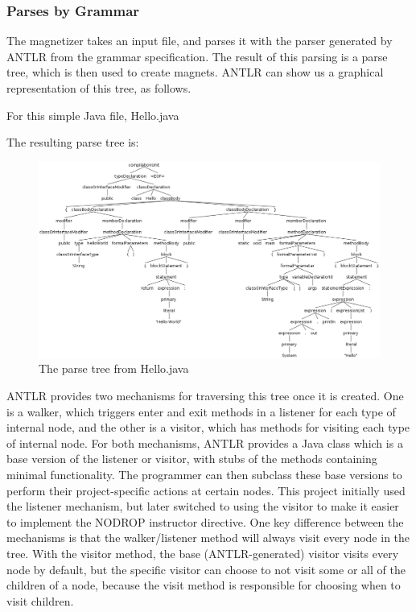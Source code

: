 \documentclass[letter,10pt,final]{article}
\begin{document}
\subsubsection{Parses by Grammar}

The magnetizer takes an input file, and parses it with the parser 
generated by ANTLR from the grammar specification. The result of this 
parsing is a parse tree, which is then used to create magnets. ANTLR 
can show us a graphical representation of this tree, as follows.

For this simple Java file, Hello.java


The resulting parse tree is:

\begin{figure}[h!]
 \centering
 \includegraphics[width=\linewidth]{./images/hello_parse_tree.png}
 \caption{The parse tree from Hello.java}
 \label{fig:hello_parse_tree}
\end{figure}

ANTLR provides two mechanisms for traversing this tree once it is 
created. One is a walker, which triggers enter and exit methods in a 
listener for each type of internal node, and the other is a visitor, 
which has methods for visiting each type of internal node. For 
both mechanisms, ANTLR provides a Java class which is a base version of 
the listener or visitor, with stubs of the methods containing minimal 
functionality. The programmer can then subclass these base 
versions to perform their project-specific actions at certain nodes. 
This project initially used the listener mechanism, but later switched 
to using the visitor to make it easier to implement the NODROP 
instructor directive. One key difference between the mechanisms is that 
the walker/listener method will always visit every node in the tree. 
With the visitor method, the base (ANTLR-generated) visitor visits 
every node by default, but the specific visitor can choose to not visit 
some or all of the children of a node, because the visit method is 
responsible for choosing when to visit children.
\end{document}
